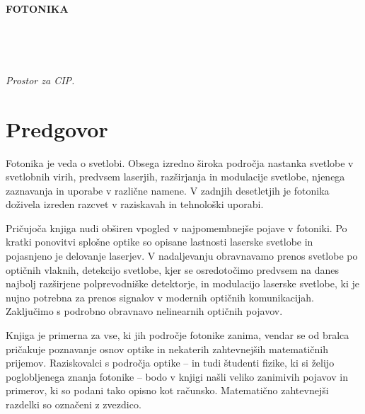 \documentclass[a4paper,10pt,fleqn]{book}
\begin{document}

\strut
\vfill
\thispagestyle{empty}
\centerline{\textbf{FOTONIKA}}


\lihastran~
\thispagestyle{empty}
\vfill\vfill
{}
\vfill
{}
\vfill\vfill\vfill
\vfill
{}


\sodastran~
\thispagestyle{empty}

\vfill
\begin{CIP}
   \emph{Prostor za CIP.}
\end{CIP}


\lihastran
\thispagestyle{plain}

\chapter*{Predgovor}
Fotonika je veda o svetlobi. Obsega izredno široka področja nastanka svetlobe
v svetlobnih virih, predvsem laserjih, razširjanja in modulacije svetlobe,
njenega zaznavanja in uporabe v različne namene. V zadnjih 
desetletjih je fotonika doživela izreden razcvet v raziskavah in 
tehnološki uporabi.

Pričujoča knjiga nudi obširen vpogled v najpomembnejše pojave v fotoniki.
Po kratki ponovitvi splošne optike so opisane lastnosti laserske svetlobe
in pojasnjeno je delovanje laserjev. V nadaljevanju obravnavamo prenos
svetlobe po optičnih vlaknih, detekcijo svetlobe, kjer se osredotočimo 
predvsem na danes najbolj razširjene polprevodniške detektorje, in 
modulacijo laserske svetlobe, ki je nujno potrebna za prenos signalov
v modernih optičnih komunikacijah. Zaključimo s podrobno obravnavo 
nelinearnih optičnih pojavov. 

Knjiga je primerna za vse, ki jih področje fotonike zanima, 
vendar se od bralca pričakuje poznavanje osnov optike in nekaterih 
zahtevnejših matematičnih prijemov. Raziskovalci s področja optike 
-- in tudi študenti fizike, ki si želijo poglobljenega znanja fotonike -- 
bodo v knjigi našli veliko zanimivih pojavov in primerov, ki so podani 
tako opisno kot računsko. Matematično zahtevnejši razdelki so označeni 
z zvezdico.
\end{document}
